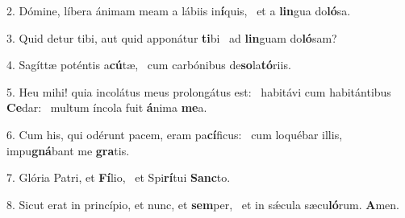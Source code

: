 2. Dómine, líbera ánimam meam a lábiis in\textbf{í}quis, \ast\  et a \textbf{lin}gua do\textbf{ló}sa.\

3. Quid detur tibi, aut quid apponátur \textbf{ti}bi \ast\  ad \textbf{lin}guam do\textbf{ló}sam?\

4. Sagíttæ poténtis a\textbf{cú}tæ, \ast\  cum carbónibus de\textbf{so}la\textbf{tó}riis.\

5. Heu mihi! quia incolátus meus prolongátus est: \dag\  habitávi cum habitántibus \textbf{Ce}dar: \ast\  multum íncola fuit \textbf{á}nima \textbf{me}a.\

6. Cum his, qui odérunt pacem, eram pa\textbf{cí}ficus: \ast\  cum loquébar illis, impu\textbf{gná}bant me \textbf{gra}tis.\

7. Glória Patri, et \textbf{Fí}lio, \ast\  et Spi\textbf{rí}tui \textbf{Sanc}to.\

8. Sicut erat in princípio, et nunc, et \textbf{sem}per, \ast\  et in sǽcula sæcu\textbf{ló}rum. \textbf{A}men.\

